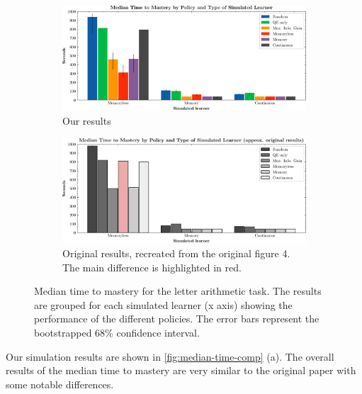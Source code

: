 \begin{figure}[h]
    \centering
    \begin{subfigure}{1\linewidth}
        \centering\includegraphics[width=1\linewidth]{figures/median-time-letter-pre.pdf}
        \caption{Our results}
    \end{subfigure}%
    \vspace{10pt}
     
    \begin{subfigure}{1\linewidth}
        \centering\includegraphics[width=1\linewidth]{figures/median-time-letter-orig-small.pdf}
        \caption{Original results, recreated from the original figure 4. The main difference is highlighted in red.}
    \end{subfigure}
    
    \caption{Median time to mastery for the letter arithmetic task. The results are grouped for each simulated learner (x axis) showing the performance of the different policies. The error bars represent the bootstrapped 68\% confidence interval.
    }
    \label{fig:median-time-comp}
\end{figure}

Our simulation results are shown in \autoref{fig:median-time-comp} (a).
The overall results of the median time to mastery are very similar to the original paper with some notable differences.

